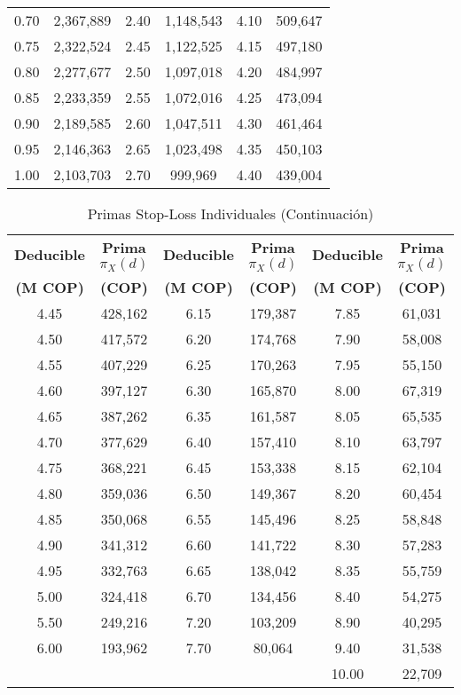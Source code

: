 \begin{table}[H]
\begin{tabular}{cccccc}
0.70 & 2,367,889 & 2.40 & 1,148,543 & 4.10 & 509,647 \\
0.75 & 2,322,524 & 2.45 & 1,122,525 & 4.15 & 497,180 \\
0.80 & 2,277,677 & 2.50 & 1,097,018 & 4.20 & 484,997 \\
0.85 & 2,233,359 & 2.55 & 1,072,016 & 4.25 & 473,094 \\
0.90 & 2,189,585 & 2.60 & 1,047,511 & 4.30 & 461,464 \\
0.95 & 2,146,363 & 2.65 & 1,023,498 & 4.35 & 450,103 \\
1.00 & 2,103,703 & 2.70 & 999,969 & 4.40 & 439,004 \\
\hline
\end{tabular}
\end{table}

\begin{table}[H]
\centering
\caption{Primas Stop-Loss Individuales (Continuación)}
\scriptsize
\begin{tabular}{cccccc}
\hline
\textbf{Deducible} & \textbf{Prima $\pi_X(d)$} & \textbf{Deducible} & \textbf{Prima $\pi_X(d)$} & \textbf{Deducible} & \textbf{Prima $\pi_X(d)$} \\
\textbf{(M COP)} & \textbf{(COP)} & \textbf{(M COP)} & \textbf{(COP)} & \textbf{(M COP)} & \textbf{(COP)} \\
\hline
4.45 & 428,162 & 6.15 & 179,387 & 7.85 & 61,031 \\
4.50 & 417,572 & 6.20 & 174,768 & 7.90 & 58,008 \\
4.55 & 407,229 & 6.25 & 170,263 & 7.95 & 55,150 \\
4.60 & 397,127 & 6.30 & 165,870 & 8.00 & 67,319 \\
4.65 & 387,262 & 6.35 & 161,587 & 8.05 & 65,535 \\
4.70 & 377,629 & 6.40 & 157,410 & 8.10 & 63,797 \\
4.75 & 368,221 & 6.45 & 153,338 & 8.15 & 62,104 \\
4.80 & 359,036 & 6.50 & 149,367 & 8.20 & 60,454 \\
4.85 & 350,068 & 6.55 & 145,496 & 8.25 & 58,848 \\
4.90 & 341,312 & 6.60 & 141,722 & 8.30 & 57,283 \\
4.95 & 332,763 & 6.65 & 138,042 & 8.35 & 55,759 \\
5.00 & 324,418 & 6.70 & 134,456 & 8.40 & 54,275 \\
5.50 & 249,216 & 7.20 & 103,209 & 8.90 & 40,295 \\
6.00 & 193,962 & 7.70 & 80,064 & 9.40 & 31,538 \\
\multicolumn{2}{|c|}{} & \multicolumn{2}{c|}{} & 10.00 & 22,709 \\
\hline
\end{tabular}
\end{table}

